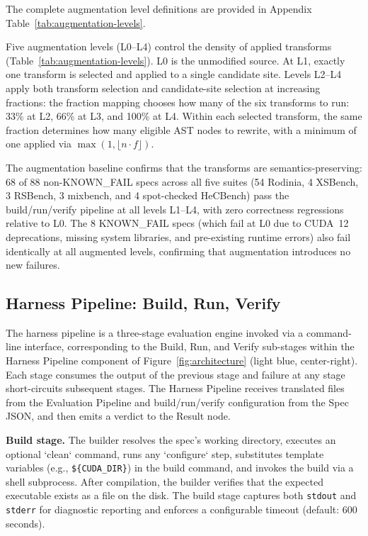 \documentclass[conference]{IEEEtran}
\begin{document}
The complete augmentation level definitions are provided in Appendix Table~\ref{tab:augmentation-levels}.


Five augmentation levels (L0--L4) control the density of applied transforms (Table~\ref{tab:augmentation-levels}). L0 is the unmodified source. At L1, exactly one transform is selected and applied to a single candidate site. Levels L2--L4 apply both transform selection and candidate-site selection at increasing fractions: the fraction mapping chooses how many of the six transforms to run: 33\% at L2, 66\% at L3, and 100\% at L4. Within each selected transform, the same fraction determines how many eligible AST nodes to rewrite, with a minimum of one applied via $\max(1, \lfloor n \cdot f \rfloor)$.

The augmentation baseline confirms that the transforms are semantics-preserving: 68 of 88 non-KNOWN\_FAIL specs across all five suites (54 Rodinia, 4 XSBench, 3 RSBench, 3 mixbench, and 4 spot-checked HeCBench) pass the build/run/verify pipeline at all levels L1--L4, with zero correctness regressions relative to L0. The 8 KNOWN\_FAIL specs (which fail at L0 due to CUDA~12 deprecations, missing system libraries, and pre-existing runtime errors) also fail identically at all augmented levels, confirming that augmentation introduces no new failures.

\subsection{Harness Pipeline: Build, Run, Verify}
\label{sec:harness}

The harness pipeline is a three-stage evaluation engine invoked via a command-line interface, corresponding to the Build, Run, and Verify sub-stages within the Harness Pipeline component of Figure~\ref{fig:architecture} (light blue, center-right). Each stage consumes the output of the previous stage and failure at any stage short-circuits subsequent stages. The Harness Pipeline receives translated files from the Evaluation Pipeline and build/run/verify configuration from the Spec JSON, and then emits a verdict to the Result node.

\textbf{Build stage.} The builder resolves the spec's working directory, executes an optional `clean` command, runs any `configure` step, substitutes template variables (e.g., \texttt{\$\{CUDA\_DIR\}}) in the build command, and invokes the build via a shell subprocess. After compilation, the builder verifies that the expected executable exists as a file on the disk. The build stage captures both \texttt{stdout} and \texttt{stderr} for diagnostic reporting and enforces a configurable timeout (default: 600 seconds).
\end{document}
